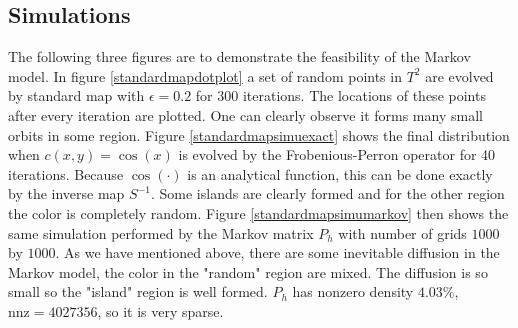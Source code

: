 \documentclass{article}
\begin{document}



     

 
    


\subsection{Simulations}

The following three figures are to demonstrate the feasibility of the Markov model. In figure \ref{standardmapdotplot} a set of random points in $T^2$ are evolved by standard map with $\epsilon=0.2$ for 300 iterations. The locations of these points after every iteration are plotted. One can clearly observe it forms many small orbits in some region. Figure \ref{standardmapsimuexact} shows the final distribution when $c(x,y) = \cos(x)$ is evolved by the Frobenious-Perron operator for 40 iterations. Because $\cos(\cdot)$ is an analytical function, this can be done exactly by the inverse map $S^{-1}$. Some islands are clearly formed and for the other region the color is completely random. Figure \ref{standardmapsimumarkov} then shows the same simulation performed by the Markov matrix $P_h$ with number of grids $1000$ by $1000$. As we have mentioned above, there are some inevitable diffusion in the Markov model, the color in the "random" region are mixed. The
diffusion is so small so the "island" region is well formed. $P_h$ has nonzero density $4.03\%$, $\text{nnz} =4027356$, so it is very sparse.
\end{document}
